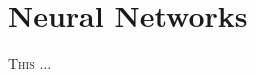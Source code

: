 \chapter{Neural Networks}
\label{chap:neuralnetworks}
%
\lettrine[lines=3]{T}{his} ...
% 
% 
\newpage
